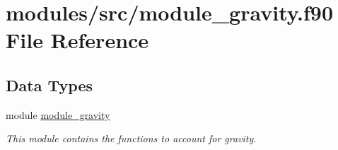 \hypertarget{module__gravity_8f90}{
\section{modules/src/module\-\_\-gravity.f90 \-File \-Reference}
\label{module__gravity_8f90}
}
\subsection*{\-Data \-Types}
\begin{DoxyCompactItemize}
\item 
module \hyperlink{classmodule__gravity}{module\-\_\-gravity}
\begin{DoxyCompactList}\small\item\em \-This module contains the functions to account for gravity. \end{DoxyCompactList}\end{DoxyCompactItemize}
